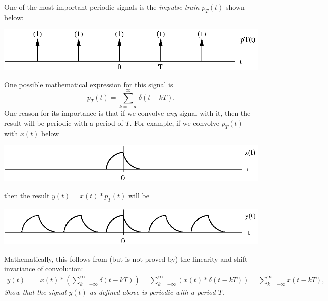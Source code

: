\documentclass[10pt]{beamer}
\newcommand{\conv}{\ast}
\begin{document}
One of the most important periodic signals is the {\em impulse train} $p_T(t)$ shown below:
\begin{center}
  \includegraphics{impulsetrain}
\end{center}
One possible mathematical expression for this signal is
\begin{equation*}
  p_T(t) = \sum_{k=-\infty}^{\infty} \delta(t - kT).
\end{equation*}
One reason for its importance is that if we convolve {\em any} signal with it, then the result will be periodic with a period of $T$.  For example, if we convolve $p_T(t)$ with $x(t)$ below
\begin{center}
  \includegraphics{impulsetrain2}
\end{center}
then the result $y(t) = x(t) \conv p_T(t) $ will be
\begin{center}
  \includegraphics{impulsetrain3}
\end{center}
Mathematically, this follows from (but is not proved by) the linearity and shift invariance of convolution:
\begin{align*}
  y(t) &= x(t) \conv \left( \sum_{k=-\infty}^{\infty} \delta(t - kT) \right)
  = \sum_{k=-\infty}^{\infty} \left( x(t) \conv \delta(t - kT) \right)
  = \sum_{k=-\infty}^{\infty} x(t - kT),
\end{align*}
{\em Show that the signal $y(t)$ as defined above is periodic with a period $T$.}
\end{document}
